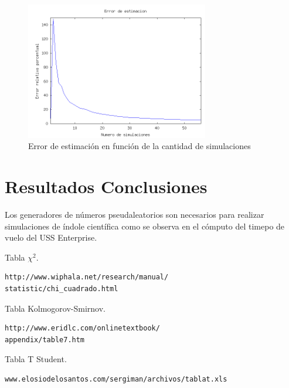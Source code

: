 \documentclass{sig-alternate}
\begin{document}
\begin{figure}[ht]
\label{fig:desvio}
\includegraphics[width=8cm]{desv}
\caption{Error de estimaci\'on en funci\'on de la cantidad de simulaciones}
\end{figure}


\newpage

\section{Resultados Conclusiones}
\label{sec:conclusiones}
Los generadores de n\'umeros pseudaleatorios son necesarios para
realizar simulaciones de \'indole cient\'ifica como se observa
en el c\'omputo del timepo de vuelo del USS Enterprise.

\begin{thebibliography}{10}
 Tabla $\chi^{2}$.
\begin{verbatim}
http://www.wiphala.net/research/manual/
statistic/chi_cuadrado.html
\end{verbatim}
 Tabla Kolmogorov-Smirnov.
\begin{verbatim}
http://www.eridlc.com/onlinetextbook/
appendix/table7.htm
\end{verbatim} 
 Tabla T Student. \begin{verbatim}www.elosiodelosantos.com/sergiman/archivos/tablat.xls\end{verbatim}
\end{thebibliography}
\end{document}
